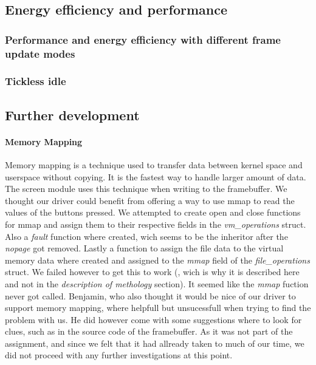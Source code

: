 \subsection{Energy efficiency and performance}

\subsubsection{Performance and energy efficiency with different frame update modes}

\subsubsection{Tickless idle}

\subsection{Further development}
\paragraph{Memory Mapping}
Memory mapping is a technique used to transfer data between kernel space and userspace without copying. It is the fastest way to handle larger amount of data. The screen module uses this technique when writing to the framebuffer. We thought our driver could benefit from offering a way to use mmap to read the values of the buttons pressed. We attempted to create open and close functions for mmap and assign them to their respective fields in the \emph{vm\_operations} struct. Also a \emph{fault} function where created, wich seems to be the inheritor after the \emph{nopage} got removed. Lastly a function to assign the file data to the virtual memory data where created and assigned to the \emph{mmap} field of the \emph{file\_operations} struct. We failed however to get this to work (, wich is why it is described here and not in the \emph{description of methology} section). It seemed like the \emph{mmap} fuction never got called. Benjamin, who also thought it would be nice of our driver to support memory mapping, where helpfull but unsucessfull when trying to find the problem with us. He did however come with some suggestions where to look for clues, such as in the source code of the framebuffer. As it was not part of the assignment, and since we felt that it had allready taken to much of our time, we did not proceed with any further investigations at this point.
